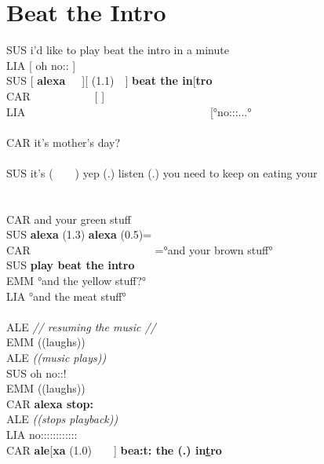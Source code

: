 \section{Beat the Intro}\label{app:fragments-home beat-the-intro}
\begin{inlinefrag}
    \begin{transcript}
        \by SUS {i'd like to play beat the intro in a minute} \\
        \by LIA {[ oh no:: ]} \\
        \by SUS {[ \textbf{alexa}~~~][ (1.1)~~] \textbf{beat the in}[\textbf{tro}} \\
        \by CAR {~~~~~~~~~~~[  ] } \\
        \by LIA {~~~~~~~~~~~~~~~~~~~~~~~~~~~~~~~~~[°no:::...°} \\
         \\
        \by CAR {it's mother's day?} \\
         \\
        \by SUS {it's (~~~~) yep (.) listen (.) you need to keep on eating your} \\
         \\
         \\
        \by CAR {and your green stuff} \\
        \by SUS {\textbf{alexa} (1.3) \textbf{alexa} (0.5)=} \\
        \by CAR { ~~~~~~~~~~~~~~~~~~~~~~=°and your brown stuff° } \\
        \by SUS {\textbf{play beat the intro}} \\
        \by EMM {°and the yellow stuff?°} \\
        \by LIA {°and the meat stuff°} \\
         \\
        \by ALE {\textit{// resuming the music //}} \\
        \by EMM {((laughs))} \\
        \by ALE {\textit{((music plays))}} \\
        \by SUS {oh no::!} \\
        \by EMM {((laughs))} \\
        \by CAR {\textbf{alexa stop:}} \\
        \by ALE {\textit{((stops playback))}} \\
        \by LIA {no::::::::::::} \\
        \by CAR {\textbf{ale}[\textbf{xa} (1.0)~~~~] \textbf{bea:t: the (.) in\underline{t}ro}} \\

\end{transcript}
\end{inlinefrag}
